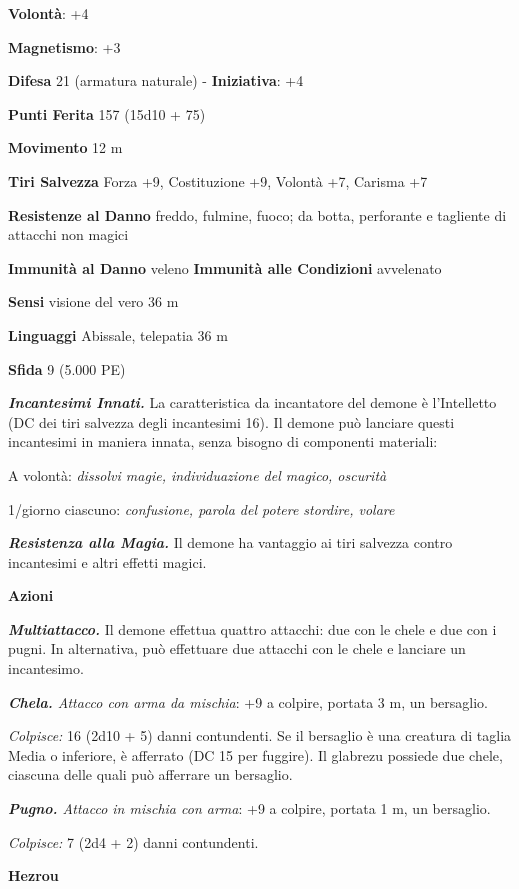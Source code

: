 \begin{multicols}{2}
\textbf{Volontà}: +4

\textbf{Magnetismo}: +3

\textbf{Difesa} 21 (armatura naturale) - \textbf{Iniziativa}: +4

\textbf{Punti Ferita} 157 (15d10 + 75)

\textbf{Movimento} 12 m

\textbf{Tiri Salvezza} Forza +9, Costituzione +9, Volontà +7, Carisma
+7

\textbf{Resistenze al Danno} freddo, fulmine, fuoco; da botta,
perforante e tagliente di attacchi non magici

\textbf{Immunità al Danno} veleno \textbf{Immunità alle Condizioni}
avvelenato

\textbf{Sensi} visione del vero 36 m

\textbf{Linguaggi} Abissale, telepatia 36 m 

\textbf{Sfida} 9 (5.000 PE)\smallskip

\emph{\textbf{Incantesimi Innati.}} La caratteristica da incantatore del
demone è l'Intelletto (DC dei tiri salvezza degli incantesimi 16). Il
demone può lanciare questi incantesimi in maniera innata, senza bisogno
di componenti materiali:

A volontà: \emph{dissolvi magie, individuazione del magico, oscurità}

1/giorno ciascuno: \emph{confusione, parola del potere stordire, volare}

\emph{\textbf{Resistenza alla Magia.}} Il demone ha vantaggio ai tiri
salvezza contro incantesimi e altri effetti magici.

\smallskip\textbf{Azioni}

\emph{\textbf{Multiattacco.}} Il demone effettua quattro attacchi: due
con le chele e due con i pugni. In alternativa, può effettuare due
attacchi con le chele e lanciare un incantesimo.

\emph{\textbf{Chela.} Attacco con arma da mischia}: +9 a colpire,
portata 3 m, un bersaglio.

\emph{Colpisce:} 16 (2d10 + 5) danni contundenti. Se il bersaglio è una
creatura di taglia Media o inferiore, è afferrato (DC 15 per fuggire).
Il glabrezu possiede due chele, ciascuna delle quali può afferrare un
bersaglio.

\emph{\textbf{Pugno.} Attacco in mischia con arma}: +9 a colpire,
portata 1 m, un bersaglio.

\emph{Colpisce:} 7 (2d4 + 2) danni contundenti.

\textbf{Hezrou}


\end{multicols}
